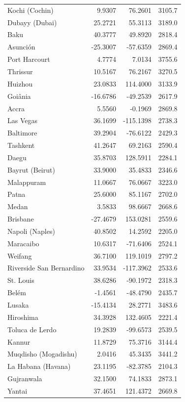 \begin{longtable}{lrrc}
Kochi (Cochin) & 9.9307 & 76.2601 & 3105.7 \\
Dubayy (Dubai) & 25.2721 & 55.3113 & 3189.0 \\
Baku & 40.3777 & 49.8920 & 2818.4 \\
Asunción & -25.3007 & -57.6359 & 2869.4 \\
Port Harcourt & 4.7774 & 7.0134 & 3755.6 \\
Thrissur & 10.5167 & 76.2167 & 3270.5 \\
Huizhou & 23.0833 & 114.4000 & 3133.9 \\
Goiânia & -16.6786 & -49.2539 & 2617.9 \\
Accra & 5.5560 & -0.1969 & 2869.8 \\
Las Vegas & 36.1699 & -115.1398 & 2738.3 \\
Baltimore & 39.2904 & -76.6122 & 2429.3 \\
Tashkent & 41.2647 & 69.2163 & 2590.4 \\
Daegu & 35.8703 & 128.5911 & 2284.1 \\
Bayrut (Beirut) & 33.9000 & 35.4833 & 2346.6 \\
Malappuram & 11.0667 & 76.0667 & 3223.0 \\
Patna & 25.6000 & 85.1167 & 2702.0 \\
Medan & 3.5833 & 98.6667 & 2668.6 \\
Brisbane & -27.4679 & 153.0281 & 2559.6 \\
Napoli (Naples) & 40.8502 & 14.2592 & 2205.0 \\
Maracaibo & 10.6317 & -71.6406 & 2524.1 \\
Weifang & 36.7100 & 119.1019 & 2797.2 \\
Riverside San Bernardino & 33.9534 & -117.3962 & 2533.6 \\
St. Louis & 38.6286 & -90.1972 & 2318.3 \\
Belém & -1.4561 & -48.4790 & 2435.7 \\
Lusaka & -15.4134 & 28.2771 & 3483.6 \\
Hiroshima & 34.3928 & 132.4605 & 2221.4 \\
Toluca de Lerdo & 19.2839 & -99.6573 & 2539.5 \\
Kannur & 11.8729 & 75.3716 & 3144.4 \\
Muqdisho (Mogadishu) & 2.0416 & 45.3435 & 3441.2 \\
La Habana (Havana) & 23.1195 & -82.3785 & 2104.3 \\
Gujranwala & 32.1500 & 74.1833 & 2873.1 \\
Yantai & 37.4651 & 121.4372 & 2669.8 \\

\end{longtable}
